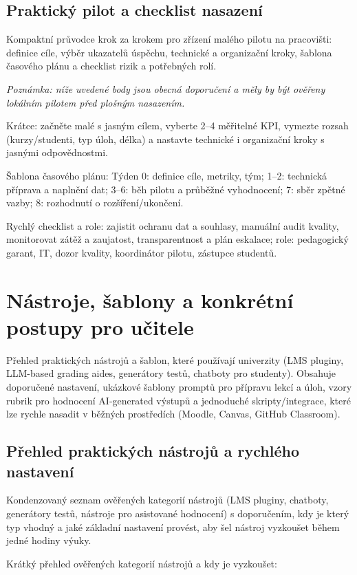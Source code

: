 \documentclass{report}%
\begin{document}
%
\section{Praktický pilot a checklist nasazení}%
Kompaktní průvodce krok za krokem pro zřízení malého pilotu na pracovišti: definice cíle, výběr ukazatelů úspěchu, technické a organizační kroky, šablona časového plánu a checklist rizik a potřebných rolí.%


%
\noindent\textit{Poznámka: níže uvedené body jsou obecná doporučení a měly by být ověřeny lokálním pilotem před plošným nasazením.}

Krátce: začněte malé s jasným cílem, vyberte 2–4 měřitelné KPI, vymezte rozsah (kurzy/studenti, typ úloh, délka) a nastavte technické i organizační kroky s jasnými odpovědnostmi.

Šablona časového plánu: Týden 0: definice cíle, metriky, tým; 1--2: technická příprava a naplnění dat; 3--6: běh pilotu a průběžné vyhodnocení; 7: sběr zpětné vazby; 8: rozhodnutí o rozšíření/ukončení.

Rychlý checklist a role: zajistit ochranu dat a souhlasy, manuální audit kvality, monitorovat zátěž a zaujatost, transparentnost a plán eskalace; role: pedagogický garant, IT, dozor kvality, koordinátor pilotu, zástupce studentů.%

%
\chapter{Nástroje, šablony a konkrétní postupy pro učitele}%
Přehled praktických nástrojů a šablon, které používají univerzity (LMS pluginy, LLM-based grading aides, generátory testů, chatboty pro studenty). Obsahuje doporučené nastavení, ukázkové šablony promptů pro přípravu lekcí a úloh, vzory rubrik pro hodnocení AI-generated výstupů a jednoduché skripty/integrace, které lze rychle nasadit v běžných prostředích (Moodle, Canvas, GitHub Classroom).%
\section{Přehled praktických nástrojů a rychlého nastavení}%
Kondenzovaný seznam ověřených kategorií nástrojů (LMS pluginy, chatboty, generátory testů, nástroje pro asistované hodnocení) s doporučením, kdy je který typ vhodný a jaké základní nastavení provést, aby šel nástroj vyzkoušet během jedné hodiny výuky.%


%
Krátký přehled ověřených kategorií nástrojů a kdy je vyzkoušet:
\end{document}
